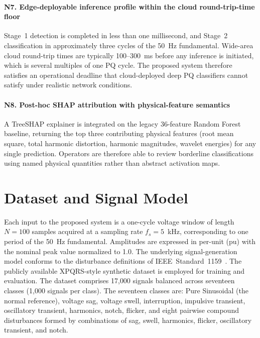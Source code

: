 \documentclass[conference]{IEEEtran}
\begin{document}
\paragraph{N7. Edge-deployable inference profile within the cloud
round-trip-time floor}
Stage~1 detection is completed in less than one millisecond, and
Stage~2 classification in approximately three cycles of the 50~Hz
fundamental. Wide-area cloud round-trip times are typically
100--300~ms before any inference is initiated, which is several
multiples of one PQ cycle. The proposed system therefore
satisfies an operational deadline that cloud-deployed deep PQ
classifiers cannot satisfy under realistic network conditions.

\paragraph{N8. Post-hoc SHAP attribution with physical-feature
semantics}
A TreeSHAP explainer is integrated on the legacy 36-feature Random
Forest baseline, returning the top three contributing physical
features (root mean square, total harmonic distortion, harmonic
magnitudes, wavelet energies) for any single prediction. Operators are
therefore able to review borderline classifications using named
physical quantities rather than abstract activation maps.

\section{Dataset and Signal Model}\label{sec:dataset}
Each input to the proposed system is a one-cycle voltage window of
length $N = 100$ samples acquired at a sampling rate $f_s = 5$~kHz,
corresponding to one period of the 50~Hz fundamental. Amplitudes are
expressed in per-unit (pu) with the nominal peak value normalized to
1.0. The underlying signal-generation model conforms to the disturbance
definitions of IEEE~Standard~1159~\cite{ieee1159}. The publicly
available XPQRS-style synthetic dataset is employed for training and
evaluation. The dataset comprises 17{,}000 signals balanced across
seventeen classes (1{,}000 signals per class). The seventeen classes
are: Pure Sinusoidal (the normal reference), voltage sag, voltage
swell, interruption, impulsive transient, oscillatory transient,
harmonics, notch, flicker, and eight pairwise compound disturbances
formed by combinations of sag, swell, harmonics, flicker, oscillatory
transient, and notch.
\end{document}
